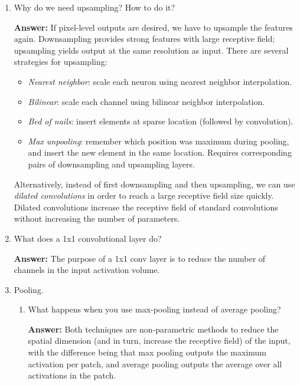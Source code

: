 \documentclass{article}
\newenvironment{QandA}{\begin{enumerate}[label=\arabic*.]}{\end{enumerate}}
\newenvironment{InnerQandA}{\begin{enumerate}[label=\roman*.]}{\end{enumerate}}
\newenvironment{answer}{\par\normalfont \textbf{Answer:}}{}
\begin{document}
\begin{QandA}
    \item Why do we need upsampling? How to do it?
    \begin{answer}
        If pixel-level outputs are desired, we have to upsample the features again. Downsampling provides strong features with large receptive field; upsampling yields output at the same resolution as input. There are several strategies for upsampling:
        \begin{itemize}
            \item \textit{Nearest neighbor}: scale each neuron using nearest neighbor interpolation.
            \item \textit{Bilinear}:  scale each channel using bilinear neighbor interpolation.
            \item \textit{Bed of nails}: insert elements at sparse location (followed by convolution).
            \item \textit{Max unpooling}: remember which position was maximum during pooling, and insert the new element in the same location. Requires corresponding pairs of downsampling and upsampling layers.
        \end{itemize}
        Alternatively, instead of first downsampling and then upsampling, we can use \textit{dilated convolutions} in order to reach a large receptive field size quickly. Dilated convolutions increase the receptive field of standard convolutions without increasing the number of parameters.
    \end{answer}

    \item What does a 1x1 convolutional layer do?
    \begin{answer}
        The purpose of a 1x1 conv layer is to reduce the number of channels in the input activation volume. 
    \end{answer}

    \item Pooling.
    \begin{InnerQandA}
        \item What happens when you use max-pooling instead of average pooling?
        \begin{answer}
            Both techniques are non-parametric methods to reduce the spatial dimension (and in turn, increase the receptive field) of the input, with the difference being that max pooling outputs the maximum activation per patch, and average pooling outputs the average over all activations in the patch. 
        \end{answer}


\end{InnerQandA}
\end{QandA}
\end{document}
